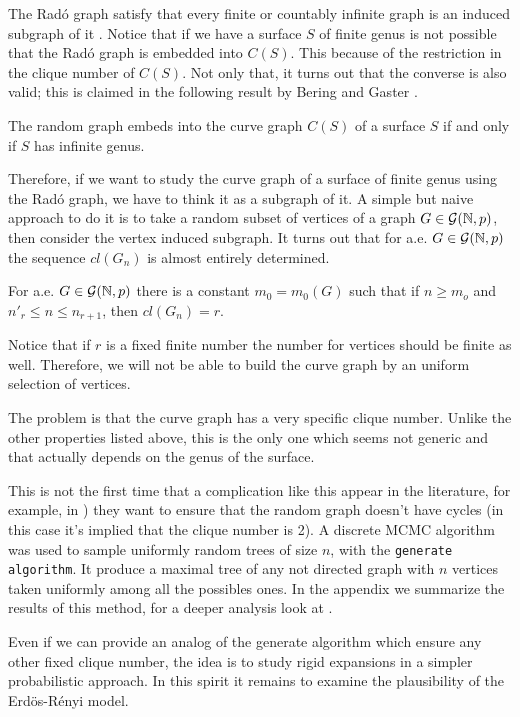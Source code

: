 The Radó graph satisfy that every finite or countably infinite graph is an induced subgraph of it \cite{DarReferenciaAqui1}. Notice that if we have a surface $S$ of finite genus is not possible that the Radó graph is embedded into $C(S)$. This because of the restriction in the clique number of $C(S)$. Not only that, it turns out that the converse is also valid; this is claimed in the following result by Bering and Gaster \cite{beringGaster}.

\begin{theorem}
The random graph embeds into the curve graph $C(S)$ of a surface $S$ if and only if $S$ has infinite genus.
\end{theorem}

Therefore, if we want to study the curve graph of a surface of finite genus using the Radó graph, we have to think it as a subgraph of it. A simple but naive approach to do it is to take a random subset of vertices of a graph $G\in \mathcal{G}(\mathbb{N}, p)$, then consider the vertex induced subgraph. It turns out that for a.e. $G\in \mathcal{G}(\mathbb{N}, p)$ the sequence $cl(G_n)$ is almost entirely determined.

\begin{theorem}
For a.e. $G \in \mathcal{G}(\mathbb{N},p)$ there is a constant $m_0 = m_{0}(G)$ such that if $n \geq m_o$ and $n'_{r} \leq n \leq n_{r+1}$, then $cl(G_{n}) = r$.
\end{theorem}

Notice that if $r$ is a fixed finite number the number for vertices should be finite as well. Therefore, we will not be able to build the curve graph by an uniform selection of vertices. 

The problem is that the curve graph has a very specific clique number. Unlike the other properties listed above, this is the only one which seems not generic and that actually depends on the genus of the surface.

This is not the first time that a complication like this appear in the literature, for example, in \cite{Alcazar15}) they want to ensure that the random graph doesn't have cycles (in this case it's implied that the clique number is 2). A discrete MCMC algorithm was used to sample uniformly random trees of size $n$, with the \texttt{generate algorithm}. It produce a maximal tree of any not directed graph with $n$ vertices taken uniformly among all the possibles ones. In the appendix we summarize the results of this method, for a deeper analysis look at \cite{Broder89}.

Even if we can provide an analog of the generate algorithm which ensure any other fixed clique number, the idea is to study rigid expansions in a simpler probabilistic approach. In this spirit it remains to examine the plausibility of the Erdös-Rényi model.


